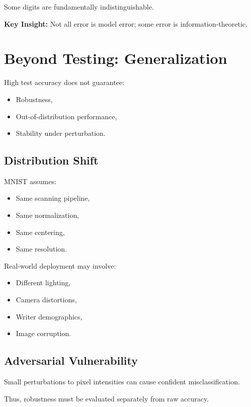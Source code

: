\documentclass[11pt]{article}
\begin{document}
Some digits are fundamentally indistinguishable.

\bigskip
\textbf{Key Insight:} Not all error is model error; some error is information-theoretic.

\section{Beyond Testing: Generalization}

High test accuracy does not guarantee:

\begin{itemize}
    \item Robustness,
    \item Out-of-distribution performance,
    \item Stability under perturbation.
\end{itemize}

\subsection{Distribution Shift}

MNIST assumes:

\begin{itemize}
    \item Same scanning pipeline,
    \item Same normalization,
    \item Same centering,
    \item Same resolution.
\end{itemize}

Real-world deployment may involve:

\begin{itemize}
    \item Different lighting,
    \item Camera distortions,
    \item Writer demographics,
    \item Image corruption.
\end{itemize}

\subsection{Adversarial Vulnerability}

Small perturbations to pixel intensities can cause confident misclassification.

Thus, robustness must be evaluated separately from raw accuracy.
\end{document}
